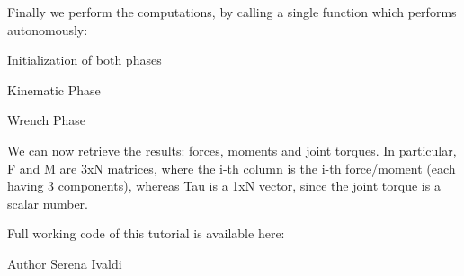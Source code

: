 Finally we perform the computations, by calling a single function which performs autonomously\+:
\begin{DoxyEnumerate}
\item Initialization of both phases
\item Kinematic Phase
\item Wrench Phase
\end{DoxyEnumerate}


\begin{DoxyCode}{0}

\end{DoxyCode}


We can now retrieve the results\+: forces, moments and joint torques. In particular, F and M are 3xN matrices, where the i-\/th column is the i-\/th force/moment (each having 3 components), whereas Tau is a 1xN vector, since the joint torque is a scalar number.


\begin{DoxyCode}{0}

\end{DoxyCode}


Full working code of this tutorial is available here\+: 
\begin{DoxyCode}{0}

\end{DoxyCode}


\begin{DoxyAuthor}{Author}
Serena Ivaldi 
\end{DoxyAuthor}
